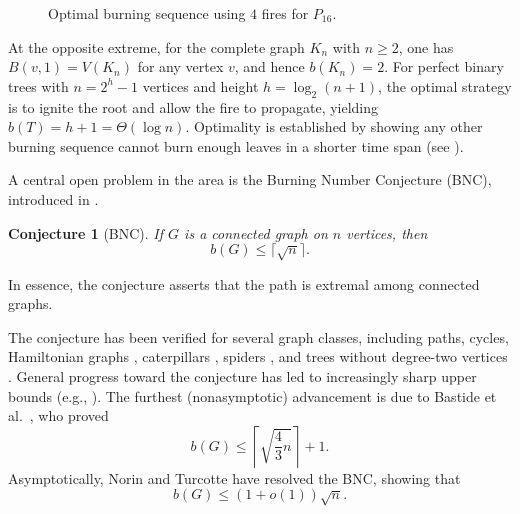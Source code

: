 \documentclass{article}
\newtheorem{conjecture}{Conjecture}
\begin{document}
\begin{figure}[t]
\caption{Optimal burning sequence using $4$ fires for $P_{16}$.}
\label{fig: P_16}
\end{figure}

At the opposite extreme, for the complete graph $K_n$ with $n \ge 2$, one has $B(v,1)=V(K_n)$ for any vertex $v$, and hence $b(K_n)=2$. 
For perfect binary trees with $n=2^h-1$ vertices and height $h=\log_2(n+1)$, the optimal strategy is to ignite the root and allow the fire to propagate, yielding $b(T)=h+1=\Theta(\log n)$. Optimality is established by showing any other burning sequence cannot burn enough leaves in a shorter time span (see \cite{das2023burning}).


A central open problem in the area is the Burning Number Conjecture (BNC), introduced in \cite{bonato2016burn}.

\begin{conjecture}[BNC]
If $G$ is a connected graph on $n$ vertices, then
\[
b(G) \le \lceil \sqrt{n} \rceil.
\]
\end{conjecture}

\noindent In essence, the conjecture asserts that the path is extremal among connected graphs. 

The conjecture has been verified for several graph classes, including paths, cycles, Hamiltonian graphs \cite{bonato2016burn}, caterpillars \cite{liu2020burning,hiller2020burning}, spiders \cite{bonato2019bounds,das2018burning}, and trees without degree-two vertices \cite{murakami2024burning}. 
General progress toward the conjecture has led to increasingly sharp upper bounds (e.g., \cite{land2016upper,bessy2018bounds}). 
The furthest (nonasymptotic) advancement is due to Bastide et al.\ \cite{BastideBonamyBonatoCharbitKamaliPierronRabie2023}, who proved
\[
b(G) \le \left\lceil \sqrt{\frac{4}{3}n} \right\rceil + 1.
\]
Asymptotically, Norin and Turcotte \cite{norin2024burning} have resolved the BNC, showing that
\[
b(G) \le (1+o(1))\sqrt{n}.
\]
\end{document}

